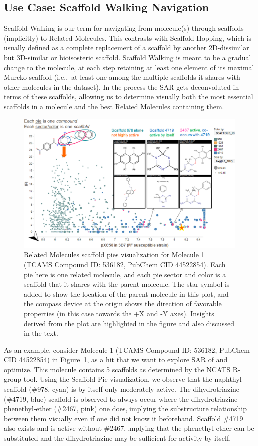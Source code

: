 \documentclass[journal=jacsat,manuscript=article]{achemso}
\newcommand*\fref[1]{Figure~\ref{fig:#1}}
\newcommand*\ie{i.e.,~}
\begin{document}
\subsection{Use Case: Scaffold Walking Navigation}
\label{sec:scafwalk}
Scaffold Walking is our term for navigating from molecule(s) through scaffolds (implicitly) to Related Molecules. This contrasts with Scaffold Hopping, which is usually defined as a complete replacement of a scaffold by another 2D-dissimilar but 3D-similar or bioisosteric scaffold. Scaffold Walking is meant to be a gradual change to the molecule, at each step retaining at least one element of its maximal Murcko scaffold (\ie at least one among the multiple scaffolds it shares with other molecules in the dataset).  In the process the SAR gets deconvoluted in terms of these scaffolds, allowing us to determine visually both the most essential scaffolds in a molecule and the best Related Molecules containing them.       
\begin{figure}
\includegraphics[width=6in]{fig/mol1_RGtool_scafpie.png}
\caption{Related Molecules scaffold pies visualization for Molecule 1 (TCAMS Compound ID: 536182, PubChem CID 44522854). Each pie here is one related molecule, and each pie sector and color is a scaffold that it shares with the parent molecule. The star symbol is added to show the location of the parent molecule in this plot, and the compass device at the origin shows the direction of favorable properties (in this case towards the +X and -Y axes). Insights derived from the plot are highlighted in the figure and also discussed in the text.}
\label{fig:scafwalk1}
\end{figure}

As an example, consider Molecule 1 (TCAMS Compound ID: 536182, PubChem CID 44522854) in \fref{scafwalk1}, as a hit that we want to explore SAR of and optimize. This molecule contains 5 scaffolds as determined by the NCATS R-group tool. Using the Scaffold Pie visualization, we observe that the naphthyl scaffold (\#978, cyan) is by itself only moderately active.  The dihydrotriazine (\#4719, blue) scaffold is observed to always occur where the dihydrotriazine-phenethyl-ether (\#2467, pink) one does, implying the substructure relationship between them visually even if one did not know it beforehand. Scaffold \#4719 also exists and is active without \#2467, implying that the phenethyl ether can be substituted and the dihydrotriazine may be sufficient for activity by itself.
\end{document}
